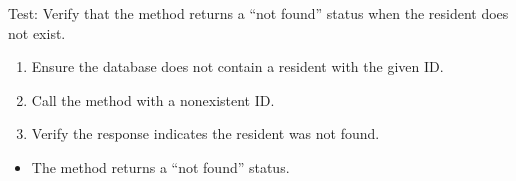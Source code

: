 \documentclass[letterpaper,10pt,english]{sphinxmanual}
\begin{document}
\begin{fulllineitems}
\label{\detokenize{test:test.test_residetnt.test_delete_resident_not_found}}
\pysigstartsignatures
\pysiglinewithargsret
{}
{}
{}
\pysigstopsignatures
\sphinxAtStartPar
Test: Verify that the method returns a “not found” status when the resident does not exist.
\begin{description}
\begin{enumerate}
%
\item {} 
\sphinxAtStartPar
Ensure the database does not contain a resident with the given ID.

\item {} 
\sphinxAtStartPar
Call the  method with a non\sphinxhyphen{}existent ID.

\item {} 
\sphinxAtStartPar
Verify the response indicates the resident was not found.

\end{enumerate}

\begin{itemize}
\item {} 
\sphinxAtStartPar
The method returns a “not found” status.

\end{itemize}

\end{description}

\end{fulllineitems}

\end{document}
